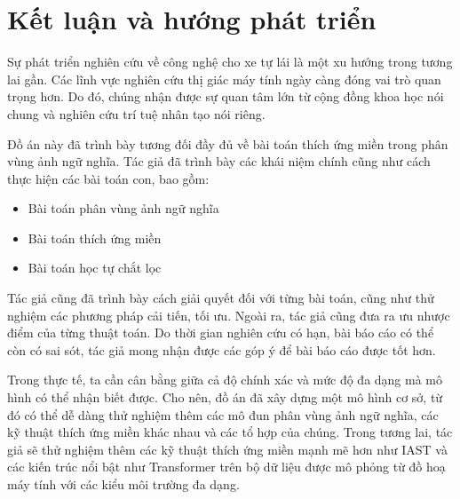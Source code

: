 \documentclass[a4paper, 13pt, oneside]{report}
\begin{document}


\pagebreak



\chapter{Kết luận và hướng phát triển}
Sự phát triển nghiên cứu về công nghệ cho xe tự lái là một xu hướng trong tương lai gần.
Các lĩnh vực nghiên cứu thị giác máy tính ngày càng đóng vai trò quan trọng hơn. Do đó, chúng nhận được sự quan tâm lớn từ cộng đồng khoa học nói chung và nghiên cứu trí tuệ nhân tạo nói riêng. 

Đồ án này đã trình bày tương đối đầy đủ về bài toán thích ứng miền trong phân vùng ảnh ngữ nghĩa. Tác giả đã trình bày các khái niệm chính cũng như cách thực hiện các bài toán con, bao gồm:
\begin{itemize}
    \item Bài toán phân vùng ảnh ngữ nghĩa
    \item Bài toán thích ứng miền 
    \item Bài toán học tự chắt lọc 
\end{itemize}

Tác giả cũng đã trình bày cách giải quyết đối với từng bài toán, cũng như thử nghiệm các phương pháp cải tiến, tối ưu. Ngoài ra, tác giả cũng đưa ra ưu nhược điểm của từng thuật toán. Do thời gian nghiên cứu có hạn, bài báo cáo có thể còn có sai sót, tác giả mong nhận được các góp ý để bài báo cáo được tốt hơn.

Trong thực tế, ta cần cân bằng giữa cả độ chính xác và mức độ đa dạng mà mô hình có thể nhận biết được. Cho nên, đồ án đã xây dựng một mô hình cơ sở, từ đó có thể dễ dàng thử nghiệm thêm các mô đun phân vùng ảnh ngữ nghĩa, các kỹ thuật thích ứng miền khác nhau và các tổ hợp của chúng.  Trong tương lai, tác giả sẽ thử nghiệm thêm các kỹ thuật thích ứng miền mạnh mẽ hơn như IAST và các kiến trúc nổi bật như Transformer trên bộ dữ liệu được mô phỏng từ đồ hoạ máy tính với các kiểu môi trường đa dạng.

\pagebreak


\end{document}
